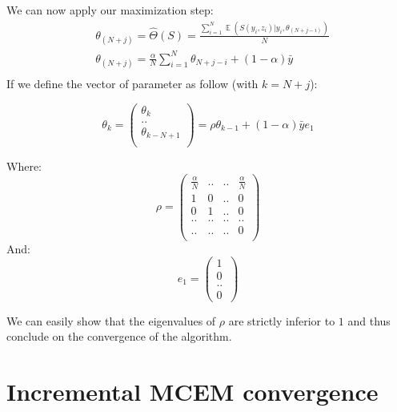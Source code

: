 \documentclass{article}
\theoremstyle{plain}
\DeclareMathOperator*{\E}{\mathbb{E}}
\theoremstyle{plain}
\theoremstyle{definition}
\begin{document}
\noindent We can now apply our maximization step:
\begin{equation}
\begin{split}
& \theta_{(N+j)} = \hat{\Theta}(S) = \frac{\sum_{i=1}^{N}{\E{(S(y_i,z_i)|y_i,\theta_{(N+j-i)})}}}{N}\\
& \theta_{(N+j)} = \frac{\alpha}{N} \sum_{i=1}^{N}{\theta_{N+j-i}} + (1-\alpha)\bar{y}\\
\end{split}
\end{equation}
If we define the vector of parameter as follow (with $k=N+j$):

\begin{equation}
\theta_{k} = 
\left(
\begin{array}{c}
\theta_{k}\\
..\\
\theta_{k-N+1}\\
\end{array}
\right) = \rho \theta_{k-1} + (1-\alpha)\bar{y}e_1 
\end{equation}

Where:
\begin{equation}
\rho = \begin{pmatrix} 
\frac{\alpha}{N} & .. & .. & \frac{\alpha}{N} \\
1 & 0 & .. & 0\\
0 & 1 & .. & 0\\
.. & .. & .. & ..\\
.. & .. & .. & 0\\
\end{pmatrix}
\end{equation}
And:
\begin{equation}
e_1 = \begin{pmatrix} 
1\\
0\\
..\\
0\
\end{pmatrix} 
\end{equation}

We can easily show that the eigenvalues of $\rho$ are strictly inferior to $1$ and thus conclude on the convergence of the algorithm. \\

\section{Incremental MCEM convergence}
\end{document}
